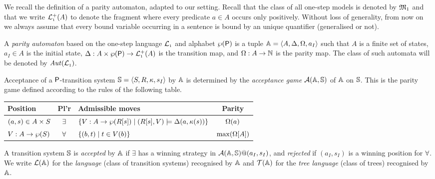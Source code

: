 
We recall the definition of a parity automaton, adapted to our setting.
Recall that the class of all one-step models is denoted by $\mathfrak{M}_1$ and that we write $\mathcal{L}_{\scriptscriptstyle 1}^+(A)$ to denote the fragment where every predicate $a\in A$ occurs only positively.
Without loss of generality, from now on we always assume that every bound variable occurring in a sentence is bound by an unique quantifier (generalised or not).




\begin{definition} \label{def:partityaut}
A \emph{parity automaton} based on the one-step language $\mathcal{L}_{\scriptscriptstyle 1}$ and 
alphabet $\wp(\mathsf{P})$ is a tuple $\mathbb{A} = \langle{A,\Delta,\Omega,a_I}\rangle$ such that $A$ is a
finite set of states, $a_I \in A$ is the initial state,
$\Delta: A\times \wp(\mathsf{P}) \to \mathcal{L}_{\scriptscriptstyle 1}^+(A)$
is the transition map, and $\Omega: A \to \mathbb{N}$ is the parity map.
The class of such automata will be denoted by $\mathit{Aut}(\mathcal{L}_{\scriptscriptstyle 1})$.

Acceptance of a $\mathsf{P}$-transition
system $\mathbb{S} = \langle{S,R,\kappa,s_I}\rangle$ by $\mathbb{A}$ is determined by the \emph{acceptance game}
$\mathcal{A}(\mathbb{A},\mathbb{S})$ of $\mathbb{A}$ on $\mathbb{S}$. This is the parity game defined
according to the rules of the following table.
%
\begin{center}
\small
\begin{tabular}{|l|c|l|c|} \hline
Position & Pl'r & Admissible moves & Parity \\
\hline
    $(a,s) \in A \times S$
  & $\exists$
  & $\{V : A \to \wp(R[s]) \mid (R[s],V) \models \Delta (a, \kappa(s)) \}$
  & $\Omega(a)$ 
\\
    $V : A \rightarrow \wp(S)$
  & $\forall$
  & $\{(b,t) \mid t \in V(b)\}$
  & $\max(\Omega[A])$
\\ \hline
 \end{tabular}
\end{center}
%
A transition system $\mathbb{S}$ is \emph{accepted} by $\mathbb{A}$ if $\exists$ has
a winning strategy in $\mathcal{A}(\mathbb{A},\mathbb{S})@(a_I,s_I)$, and \emph{rejected}
if $(a_I,s_I)$ is a winning position for $\forall$. We write $\mathcal{L}(\mathbb{A})$ for the \emph{language} (class of transition systems) recognised by $\mathbb{A}$ and $\mathcal{T}(\mathbb{A})$ for the \emph{tree language} (class of trees) recognised by $\mathbb{A}$.
\end{definition}

